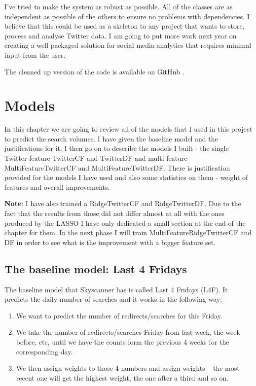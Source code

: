 \documentclass[minf,twoside,singlespacing,parskip,frontabs,notimes,11pt]{infthesis}
\begin{document}
I've tried to make the system as robust as possible. All of the classes are as independent as possible of the others to ensure no problems with dependencies. I believe that this could be used as a skeleton to any project that wants to store, process and analyse Twitter data. I am going to put more work next year on creating a well packaged solution for social media analytics that requires minimal input from the user.

The cleaned up version of the code is available on GitHub \cite{code}.






\chapter{Models}
\label{chap:model}


In this chapter we are going to review all of the models that I used in this project to predict the search volumes. I have given the baseline model and the justifications for it. I then go on to describe the models I built - the single Twitter feature TwitterCF and TwitterDF and multi-feature MultiFeatureTwitterCF and MultiFeatureTwitterDF. There is justification provided for the models I have used and also some statistics on them - weight of features and overall improvements. 


\textbf{Note}: I have also trained a RidgeTwitterCF and RidgeTwitterDF. Due to the fact that the results from those did not differ almost at all with the ones produced by the LASSO I have only dedicated a small section at the end of the chapter for them. In the next phase I will train MultiFeatureRidgeTwitterCF and DF in order to see what is the improvement with a bigger feature set.


\section{The baseline model: Last 4 Fridays}
\label{sec:baseline}

The baseline model that Skyscanner has is called Last 4 Fridays (L4F). 
It predicts the daily number of searches and it works in the following way:
\begin{enumerate}
\item We want to predict the number of redirects/searches for this Friday.
\item We take the number of redirects/searches Friday from last week, the week before, etc, until we have the counts form the previous 4 weeks for the corresponding day.
\item We then assign weights to those 4 numbers and assign weights -- the most recent one will get the highest weight, the one after a third and so on.
\end{enumerate}
\end{document}
